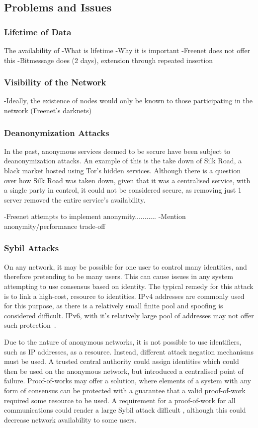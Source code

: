 	\subsection{Problems and Issues}
		\subsubsection*{Lifetime of Data}
			The availability of 
			-What is lifetime
			-Why it is important
			-Freenet does not offer this
			-Bitmessage does (2 days), extension through repeated insertion
		\subsubsection*{Visibility of the Network}
			-Ideally, the existence of nodes would only be known to those participating in the network (Freenet's darknets)
		\subsubsection*{Deanonymization Attacks}
			In the past, anonymous services deemed to be secure have been subject to deanonymization attacks. An example of this is the take down of Silk Road, a black market hosted using Tor's hidden services. Although there is a question over how Silk Road was taken down, given that it was a centralised service, with a single party in control, it could not be considered secure, as removing just 1 server removed the entire service's availability.
			
			-Freenet attempts to implement anonymity...........
			-Mention anonymity/performance trade-off
		\subsubsection*{Sybil Attacks} \label{sybil_problems}
			On any network, it may be possible for one user to control many identities, and therefore pretending to be many users. This can cause issues in any system attempting to use consensus based on identity. The typical remedy for this attack is to link a high-cost, resource to identities. IPv4 addresses are commonly used for this purpose, as there is a relatively small finite pool and spoofing is considered difficult. IPv6, with it's relatively large pool of addresses may not offer such protection~\cite{cholez2009evaluation}.
		
			Due to the nature of anonymous networks, it is not possible to use identifiers, such as IP addresses, as a resource. Instead, different attack negation mechanisms must be used. A trusted central authority could assign identities which could then be used on the anonymous network, but introduced a centralised point of failure. Proof-of-works may offer a solution, where elements of a system with any form of consensus can be protected with a guarantee that a valid proof-of-work required some resource to be used. A requirement for a proof-of-work for all communications could render a large Sybil attack difficult \cite{borisov2006computational}, although this could decrease network availability to some users.
		
